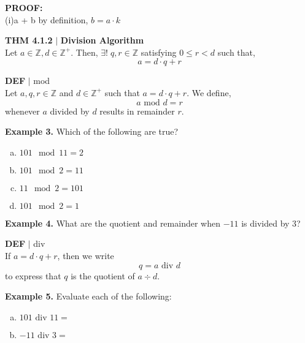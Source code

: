 \documentclass [12pt]{article}
\begin{document}
\raggedright
\textbf{PROOF:} \\
\quad(i)a + b by definition, $b = a \cdot k$
\vspace{3in}
\begin{framed}
\textbf{THM 4.1.2} $|$ \textbf{Division Algorithm }\\
\vspace{0.5cm}
Let $a\in \mathbb{Z}, d \in \mathbb{Z}^{+}$. Then, $\exists! \; q, r \in \mathbb{Z}$ satisfying $0 \leq r <
d$ such that, \\
\[ a = d\cdot q +r\]
\end{framed}
\pagebreak
\begin{framed}
\textbf{DEF} $|$ mod \\
Let $a, q, r \in \mathbb{Z}$ and $d \in \mathbb{Z}^{+}$ such that $a = d\cdot q + r$. We define, \\
\[a \text{ mod } d = r\]
whenever $a$ divided by $d$ results in remainder $r$.
\end{framed}
\vspace{0.5cm}
\raggedright
\textbf{Example 3.} Which of the following are true?
\begin{enumerate}[(a)]
\item $101 \mod 11 = 2$ \vspace{0.25cm}
\item $101 \mod 2 = 11$ \vspace{0.25cm}
\item $11 \mod 2 = 101$ \vspace{0.25cm}
\item $101 \mod 2 = 1$
\end{enumerate}
\vspace{1cm}
\raggedright
\textbf{Example 4.} What are the quotient and remainder when $-11$ is divided by 3?
\vspace{1in}
\begin{framed}
\textbf{DEF} $|$ div \\
\vspace{0.25cm}
If $a = d \cdot q + r $, then we write \[q = a \text{ div } d\] to express that $q$ is the quotient of $a \div
d$. \\
\end{framed}
\vspace{0.25cm}
\raggedright
\textbf{Example 5.} Evaluate each of the following:
\begin{enumerate}[(a)]
\item $101 \text{ div } 11 = $ \vspace{0.5cm}
\item $-11 \text{ div } 3 = $ \vspace{0.5cm}
\end{enumerate}
\pagebreak
\end{document}

